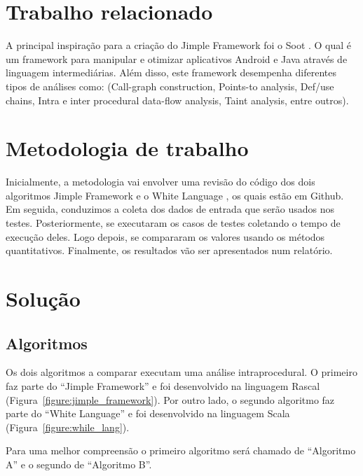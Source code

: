 \documentclass[12pt]{article}
\begin{document}
\section{Trabalho relacionado}

A principal inspiração para a criação do Jimple Framework foi o Soot \cite{soot_web}. O qual é um framework para manipular e otimizar aplicativos Android e Java através de linguagem intermediárias. Além disso, este framework desempenha diferentes tipos de análises como: (Call-graph construction, Points-to analysis, Def/use chains,  Intra e inter procedural data-flow analysis, Taint analysis, entre outros).


\section{Metodologia de trabalho}

Inicialmente, a metodologia vai envolver uma revisão do código dos dois algoritmos Jimple Framework \cite{jimple_web} e o White Language \cite{while_lang_web}, os quais estão em Github. Em seguida, conduzimos a coleta dos dados de entrada que serão usados nos testes. Posteriormente, se executaram os casos de testes coletando o tempo de execução deles. Logo depois, se compararam os valores usando os métodos quantitativos. Finalmente, os resultados vão ser apresentados num relatório.

\section{Solução}


\subsection{Algoritmos}

Os dois algoritmos a comparar executam uma análise intraprocedural. O primeiro faz parte do ``Jimple Framework'' \cite{jimple_web} e foi desenvolvido na linguagem Rascal (Figura~\ref{figure:jimple_framework}). Por outro lado, o segundo algoritmo faz parte do ``White Language'' \cite{while_lang_web} e foi desenvolvido na linguagem Scala (Figura~\ref{figure:while_lang}). 

Para uma melhor compreensão o primeiro algoritmo será chamado de ``Algoritmo A'' e o segundo de ``Algoritmo B''.
\end{document}
